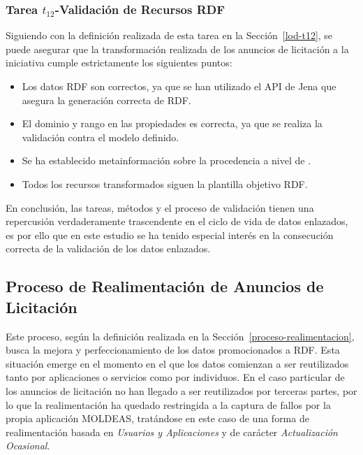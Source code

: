 \subsubsection{Tarea $t_{12}$-Validación de Recursos RDF}
Siguiendo con la definición realizada de esta tarea en la Sección~\ref{lod-t12}, se puede asegurar que la transformación 
realizada de los anuncios de licitación a la iniciativa \linkeddata cumple estrictamente los 
siguientes puntos:

\begin{itemize}
 \item Los datos RDF son correctos, ya que se han utilizado el API de Jena que asegura la generación correcta de RDF.
 \item El dominio y rango en las propiedades es correcta, ya que se realiza la validación contra el modelo definido.
 \item Se ha establecido metainformación sobre la procedencia a nivel de \dataset.
 \item Todos los recursos transformados siguen la plantilla objetivo RDF.
\end{itemize}
% 
En conclusión, las tareas, métodos y el proceso de validación tienen una repercusión verdaderamente trascendente 
en el ciclo de vida de datos enlazados, es por ello que en este estudio se ha tenido especial interés en la 
consecución correcta de la validación de los datos enlazados.
% 
\subsection{Proceso de Realimentación de Anuncios de Licitación}
Este proceso, según la definición realizada en la Sección~\ref{proceso-realimentacion}, busca la mejora 
y perfeccionamiento de los datos promocionados a \gls{RDF}. Esta situación emerge en el momento en el que 
los datos comienzan a ser reutilizados tanto por aplicaciones o servicios como por individuos. En el caso 
particular de los anuncios de licitación no han llegado a ser reutilizados por terceras partes, 
por lo que la realimentación ha quedado restringida a la captura de fallos por la propia aplicación \gls{MOLDEAS}, 
tratándose en este caso de una forma de realimentación basada en \textit{Usuarios y Aplicaciones} 
y de carácter \textit{Actualización Ocasional}.


